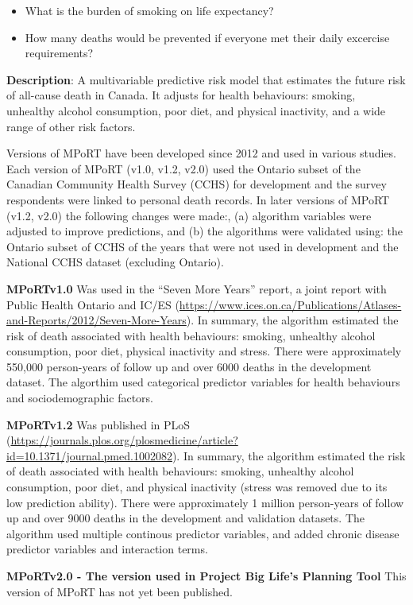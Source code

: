 \documentclass[]{book}
\providecommand{\tightlist}{%
  \setlength{\itemsep}{0pt}\setlength{\parskip}{0pt}}
\begin{document}
\begin{itemize}
\tightlist
\item
  What is the burden of smoking on life expectancy?
\item
  How many deaths would be prevented if everyone met their daily
  excercise requirements?
\end{itemize}

\textbf{Description}: A multivariable predictive risk model that
estimates the future risk of all-cause death in Canada. It adjusts for
health behaviours: smoking, unhealthy alcohol consumption, poor diet,
and physical inactivity, and a wide range of other risk factors.

Versions of MPoRT have been developed since 2012 and used in various
studies. Each version of MPoRT (v1.0, v1.2, v2.0) used the Ontario
subset of the Canadian Community Health Survey (CCHS) for development
and the survey respondents were linked to personal death records. In
later versions of MPoRT (v1.2, v2.0) the following changes were made:,
(a) algorithm variables were adjusted to improve predictions, and (b)
the algorithms were validated using: the Ontario subset of CCHS of the
years that were not used in development and the National CCHS dataset
(excluding Ontario).

\textbf{MPoRTv1.0} Was used in the ``Seven More Years'' report, a joint
report with Public Health Ontario and IC/ES
(\url{https://www.ices.on.ca/Publications/Atlases-and-Reports/2012/Seven-More-Years}).
In summary, the algorithm estimated the risk of death associated with
health behaviours: smoking, unhealthy alcohol consumption, poor diet,
physical inactivity and stress. There were approximately 550,000
person-years of follow up and over 6000 deaths in the development
dataset. The algorthim used categorical predictor variables for health
behaviours and sociodemographic factors.

\textbf{MPoRTv1.2} Was published in PLoS
(\url{https://journals.plos.org/plosmedicine/article?id=10.1371/journal.pmed.1002082}).
In summary, the algorithm estimated the risk of death associated with
health behaviours: smoking, unhealthy alcohol consumption, poor diet,
and physical inactivity (stress was removed due to its low prediction
ability). There were approximately 1 million person-years of follow up
and over 9000 deaths in the development and validation datasets. The
algorithm used multiple continous predictor variables, and added chronic
disease predictor variables and interaction terms.

\textbf{MPoRTv2.0 - The version used in Project Big Life's Planning
Tool} This version of MPoRT has not yet been published.
\end{document}

